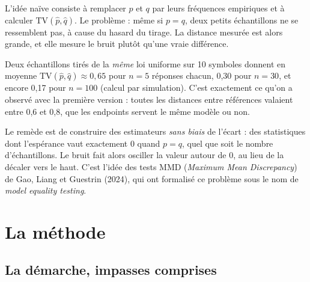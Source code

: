 \documentclass[11pt,a4paper]{report}
\theoremstyle{definition}
\theoremstyle{plain}
\begin{document}
\begin{intuition}
L'idée naïve consiste à remplacer $p$ et $q$ par leurs fréquences empiriques et à calculer $\mathrm{TV}(\hat p,\hat q)$. Le problème : même si $p=q$, deux petits échantillons ne se ressemblent pas, à cause du hasard du tirage. La distance mesurée est alors grande, et elle mesure le bruit plutôt qu'une vraie différence.
\end{intuition}

\begin{exemple}
Deux échantillons tirés de la \emph{même} loi uniforme sur 10 symboles donnent en moyenne $\mathrm{TV}(\hat p,\hat q)\approx 0{,}65$ pour $n=5$ réponses chacun, 0,30 pour $n=30$, et encore 0,17 pour $n=100$ (calcul par simulation). C'est exactement ce qu'on a observé avec la première version : toutes les distances entre références valaient entre 0,6 et 0,8, que les endpoints servent le même modèle ou non.
\end{exemple}

Le remède est de construire des estimateurs \emph{sans biais} de l'écart : des statistiques dont l'espérance vaut exactement 0 quand $p=q$, quel que soit le nombre d'échantillons. Le bruit fait alors osciller la valeur autour de 0, au lieu de la décaler vers le haut. C'est l'idée des tests MMD (\emph{Maximum Mean Discrepancy}) de Gao, Liang et Guestrin (2024), qui ont formalisé ce problème sous le nom de \emph{model equality testing}.

\chapter{La méthode}

\section{La démarche, impasses comprises}

\begin{center}
\end{center}
\end{document}
